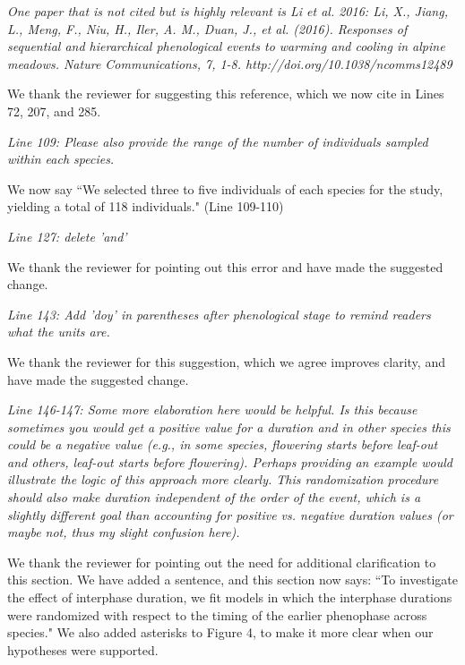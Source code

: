 \documentclass[10.95pt,a4paper]{letter}
\begin{document}
\par \emph{One paper that is not cited but is highly relevant is Li et al. 2016: Li, X., Jiang, L., Meng, F., Niu, H., Iler, A. M., Duan, J., et al. (2016). Responses of sequential and hierarchical phenological events to warming and cooling in alpine meadows. Nature Communications, 7, 1-8. http://doi.org/10.1038/ncomms12489}

\par We thank the reviewer for suggesting this reference, which we now cite in Lines 72, 207, and 285.

\par \emph{Line 109: Please also provide the range of the number of individuals sampled within each species. } 
\par We now say ``We selected three to five individuals of each species for the study, yielding a total of 118 individuals." (Line 109-110)

\par \emph{Line 127: delete 'and'}
\par We thank the reviewer for pointing out this error and have made the suggested change. 

\par \emph{Line 143: Add 'doy' in parentheses after phenological stage to remind readers what the units are.} 
\par We thank the reviewer for this suggestion, which we agree improves clarity, and have made the suggested change. 

\par \emph{Line 146-147: Some more elaboration here would be helpful.  Is this because sometimes you would get a positive value for a duration and in other species this could be a negative value (e.g., in some species, flowering starts before leaf-out and others, leaf-out starts before flowering).  Perhaps providing an example would illustrate the logic of this approach more clearly.  This randomization procedure should also make duration independent of the order of the event, which is a slightly different goal than accounting for positive vs. negative duration values (or maybe not, thus my slight confusion here).}
\par We thank the reviewer for pointing out the need for additional clarification to this section. We have added a sentence, and this section now says:
``To investigate the effect of interphase duration, we fit models in which the interphase durations were randomized with respect to the timing of the earlier phenophase across species." We also added asterisks to Figure 4, to make it more clear when our hypotheses were supported.
\end{document}
